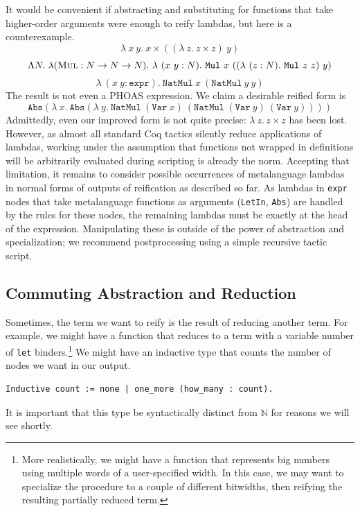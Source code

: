 It would be convenient if abstracting and substituting for functions that take higher-order arguments were enough to reify lambdas, but here is a counterexample.
\[
  \lambda\ x\ y.\ x \times ((\lambda\ z.\ z \times z)\ y)
\]
\[
  \Lambda N. \; \lambda (\textsc{Mul} : N \to N \to N).\ \lambda\ (x\ y : N).\ \texttt{Mul}\ x\ ((\lambda\ (z : N).\ \texttt{Mul}\ z\  z)\ y)
\]
\[
  \lambda\ (x\ y : \texttt{expr}).\ \texttt{NatMul}\ x\ (\texttt{NatMul}\ y\  y)
\]
The result is not even a PHOAS expression. We claim a desirable reified form is
\[
  \texttt{Abs}(\lambda\ x.\ \texttt{Abs}(\lambda\ y.\ \texttt{NatMul}\ (\texttt{Var}\ x)\ (\texttt{NatMul}\ (\texttt{Var}\ y)\  (\texttt{Var}\ y))))
\]
Admittedly, even our improved form is not quite precise: $\lambda\ z.\, z \times z$ has been lost. However, as almost all standard Coq tactics silently reduce applications of lambdas, working under the assumption that functions not wrapped in definitions will be arbitrarily evaluated during scripting is already the norm.
Accepting that limitation, it remains to consider possible occurrences of metalanguage lambdas in normal forms of outputs of reification as described so far.
As lambdas in \texttt{expr} nodes that take metalanguage functions as arguments (\texttt{LetIn}, \texttt{Abs}) are handled by the rules for these nodes, the remaining lambdas must be exactly at the head of the expression.
Manipulating these is outside of the power of abstraction and specialization; we recommend postprocessing using a simple recursive tactic script.

\subsection{Commuting Abstraction and Reduction} \label{sec:commute-abstraction-reduction}
Sometimes, the term we want to reify is the result of reducing another term.
For example, we might have a function that reduces to a term with a variable number of \texttt{let} binders.\footnote{%
    More realistically, we might have a function that represents big numbers using multiple words of a user-specified width.
    In this case, we may want to specialize the procedure to a couple of different bitwidths, then reifying the resulting partially reduced term.%
}
We might have an inductive type that counts the number of \space nodes we want in our output.
\label{sec:count-def}
\begin{verbatim}
Inductive count := none | one_more (how_many : count).
\end{verbatim}
It is important that this type be syntactically distinct from $\mathbb N$ for reasons we will see shortly.

